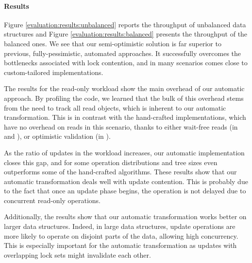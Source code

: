 \paragraph{Results} Figure \ref{evaluation:results:unbalanced} 
reports the throughput of unbalanced data structures and Figure 
\ref{evaluation:results:balanced} presents
the throughput of the balanced ones. We see that our semi-optimistic
solution is far superior to previous, fully-pessimistic, 
automated approaches. It successfully overcomes the bottlenecks
associated with lock contention, and in many scenarios comes close
to custom-tailored implementations.

The results for the read-only workload show the main overhead
of our automatic approach. By profiling the code, we learned 
that the bulk of this overhead stems from the need to track all read objects,
which is inherent to our automatic transformation. 
This is in contrast with the hand-crafted implementations,
which have no overhead on reads in this scenario, thanks to either 
wait-free reads (in \danaTree and \danaAVL), or optimistic validation (in \bronson). 
 
As the ratio of updates in the workload increases, our automatic implementation 
closes this gap, and for some operation distributions and 
tree sizes even outperforms some of the hand-crafted algorithms.
These results show that our automatic transformation deals well with update contention. 
This is probably due to the fact that once
an update phase begins, the operation is not delayed due to concurrent 
read-only operations. 

Additionally, the results show that our automatic transformation 
works better on larger data structures. Indeed, in large data structures, 
update operations are more likely to operate on disjoint parts of 
the data, allowing high concurrency. This is especially important 
for the automatic transformation as updates  with overlapping 
lock sets might invalidate each other.  
 


